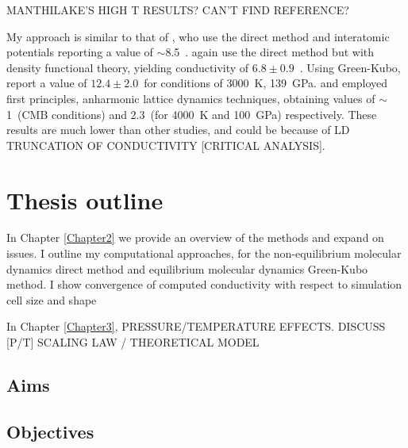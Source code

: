 MANTHILAKE'S HIGH T RESULTS? CAN'T FIND REFERENCE?

My approach is similar to that of \citet{Ammann2014}, who use the direct method and interatomic potentials reporting a value of $\sim$8.5~\wmk. \citet{Stackhouse2015} again use the direct method but with density functional theory, yielding conductivity of $6.8\pm0.9$~\wmk. Using Green-Kubo, \citet{Haigis2013} report a value of $12.4\pm2.0$~\wmks for conditions of 3000~K, 139~GPa. \citet{Tang2014} and \citet{Dekura2013} employed first principles, anharmonic lattice dynamics techniques, obtaining values of $\sim$1~\wmks (CMB conditions) and 2.3~\wmks (for 4000~K and 100~GPa) respectively. These results are much lower than other studies, and could be because of LD TRUNCATION OF CONDUCTIVITY [CRITICAL ANALYSIS].

\section{Thesis outline}
In Chapter \ref{Chapter2} we provide an overview of the methods and expand on issues. I outline my computational approaches, for the non-equilibrium molecular dynamics direct method and equilibrium molecular dynamics Green-Kubo method. I show convergence of computed conductivity with respect to simulation cell size and shape 

In Chapter \ref{Chapter3}, PRESSURE/TEMPERATURE EFFECTS. DISCUSS [P/T] SCALING LAW / THEORETICAL MODEL


\subsection{Aims}

\subsection{Objectives}